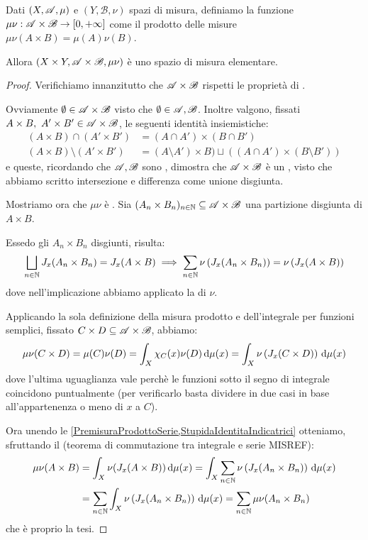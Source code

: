 \newcommand{\B}{\ensuremath{\mathscr B}}
\begin{theorem}\label{PremisuraProdotto}
	Dati $(X,\mathscr A,\mu)$ e $(Y,\B,\nu)$ spazi di misura, definiamo la funzione $\mu\nu:\A\times\B\to\Rpiu$ come il prodotto delle misure $\mu\nu(A\times B)=\mu(A)\nu(B)$.
	
	Allora $(X\times Y,\A\times\B,\mu\nu)$ è uno spazio di misura elementare.
\end{theorem}
\begin{proof}
	Verifichiamo innanzitutto che $\A\times\B$ rispetti le proprietà di \semiring{}.
	
	Ovviamente $\emptyset\in\A\times\B$ visto che $\emptyset\in\A,\B$. 
	Inoltre valgono, fissati $A\times B,\ A'\times B'\in\A\times\B$, le seguenti identità insiemistiche:
	\begin{align*}
		(A\times B)\cap (A'\times B') &= (A\cap A')\times(B\cap B')\\
		(A\times B)\setminus (A'\times B') &= (A\setminus A')\times B)\sqcup( (A\cap A')\times (B\setminus B') )
	\end{align*}
	e queste, ricordando che $\A,\B$ sono \sigalg[e], dimostra che $\A\times\B$ è un \semiring{}, visto che abbiamo scritto intersezione e differenza come unione disgiunta.
	
	Mostriamo ora che $\mu\nu$ è \sigadd{}. Sia $(A_n\times B_n)_{n\in\N}\subseteq \A\times \B$ una partizione disgiunta di $A\times B$.
	
	Essedo gli $A_n\times B_n$ disgiunti, risulta:
	\begin{equation}\label{PremisuraProdottoSerie}
		\bigsqcup_{n\in\mathbb N} J_x(A_n\times B_n) = J_x(A\times B)  \implies \sum_{n\in\mathbb N}\nu\left(J_x(A_n\times B_n)\right)=\nu\left(J_x(A\times B)\right)
	\end{equation}
	dove nell'implicazione abbiamo applicato la \sigadd[ità] di $\nu$.
	
	Applicando la sola definizione della misura prodotto e dell'integrale per funzioni semplici, fissato $C\times D\subseteq \A\times\B$, abbiamo:
	\begin{equation}\label{StupidaIdentitaIndicatrici}
		\mu\nu(C\times D)=\mu(C)\nu(D)=\int_{X}\chi_C(x)\nu(D)\,\mathrm d \mu(x)=\int_X \nu\left(J_x(C\times D)\right)\,\mathrm d\mu(x)
	\end{equation}
	dove l'ultima uguaglianza vale perchè le funzioni sotto il segno di integrale coincidono puntualmente (per verificarlo basta dividere in due casi in base all'appartenenza o meno di $x$ a $C$).
	
	Ora unendo le \cref{PremisuraProdottoSerie,StupidaIdentitaIndicatrici} otteniamo, sfruttando il (teorema di commutazione tra integrale e serie MISREF):
	\begin{align*}
		\mu\nu(A\times B)&=\int_X\nu(J_x(A\times B))\,\mathrm d \mu(x)=\int_X\sum_{n\in\mathbb N}\nu\left(J_x(A_n\times B_n)\right)\,\mathrm d\mu(x)\\
		&=\sum_{n\in\mathbb N}\int_X\nu\left(J_x(A_n\times B_n)\right)\,\mathrm d\mu(x)=\sum_{n\in\mathbb N}\mu\nu(A_n\times B_n)
	\end{align*}
	che è proprio la tesi.
\end{proof}

